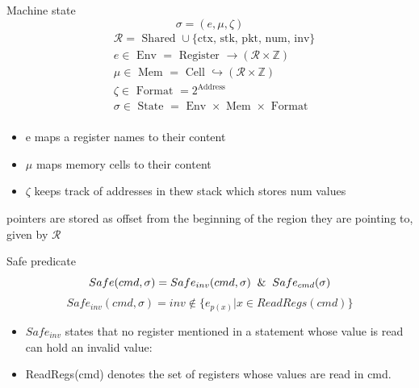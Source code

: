 \documentclass[aspectratio=169]{beamer}
\begin{document}
\begin{frame}{Machine state}
  $$\sigma = (e, \mu, \zeta)$$
  $$
    \begin{aligned}
       & \mathcal{R}=\text { Shared } \cup\{\text {ctx, stk, pkt, num, inv}\}                  \\
       & e \in \text { Env } =\text { Register } \rightarrow(\mathcal{R} \times \mathbb{Z})    \\
       & \mu \in \text { Mem } =\text { Cell } \hookrightarrow(\mathcal{R} \times \mathbb{Z})  \\
       & \zeta \in \text { Format }=2^{\text {Address }}                                       \\
       & \sigma \in \text { State }=\text { Env } \times \text { Mem } \times \text { Format } \\
       &
    \end{aligned}
  $$
  \begin{itemize}
    \item e maps a register names to their content
    \item $\mu$ maps memory cells to their content
    \item $\zeta$ keeps track of addresses in thew stack which stores num values
  \end{itemize}
  pointers are stored as offset from the beginning of the region they are pointing to, given by $\mathcal{R}$

\end{frame}

\begin{frame}{Safe predicate}
  $$ Safe(cmd, \sigma ) = Safe_{inv} (cmd, \sigma ) \And Safe_{cmd} (\sigma) $$
  $$Safe_{inv}(cmd, \sigma) = inv \notin \{ {e_{p(x)} | x \in ReadRegs(cmd)\}}$$
  \begin{itemize}
    \item $Safe_{inv}$ states that no register mentioned
          in a statement whose value is read can hold an invalid value:
    \item ReadRegs(cmd) denotes the set of registers whose
          values are read in cmd.
  \end{itemize}
\end{frame}
\end{document}
